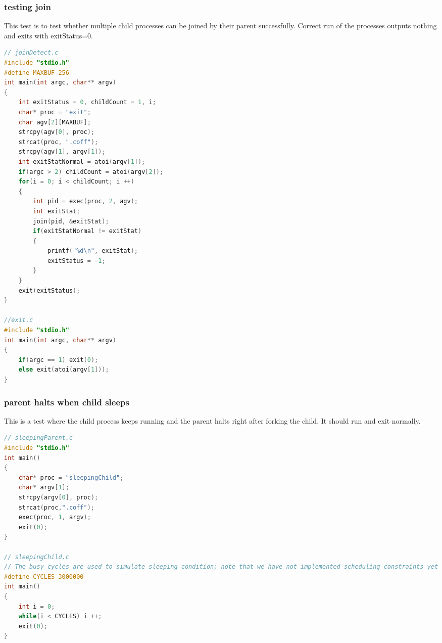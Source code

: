 \documentclass{article}
\begin{document}
\begin{spacing}{1.1}
\subsubsection{testing \textsf{join}}
This test is to test whether multiple child processes can be joined by their parent successfully. Correct run of the processes outputs nothing and exits with \textsf{exitStatus}=0.
\begin{lstlisting}[language=C]
// joinDetect.c
#include "stdio.h"
#define MAXBUF 256
int main(int argc, char** argv)
{
    int exitStatus = 0, childCount = 1, i;
    char* proc = "exit";
    char agv[2][MAXBUF];
    strcpy(agv[0], proc);
    strcat(proc, ".coff");
    strcpy(agv[1], argv[1]);
    int exitStatNormal = atoi(argv[1]);
    if(argc > 2) childCount = atoi(argv[2]);
    for(i = 0; i < childCount; i ++)
    {
        int pid = exec(proc, 2, agv);
        int exitStat;
        join(pid, &exitStat);
        if(exitStatNormal != exitStat)
        {
            printf("%d\n", exitStat);
            exitStatus = -1;
        }
    }
    exit(exitStatus);
}

//exit.c
#include "stdio.h"
int main(int argc, char** argv)
{
    if(argc == 1) exit(0);
    else exit(atoi(argv[1]));
}
\end{lstlisting}

\subsubsection{parent halts when child sleeps}
This is a test where the child process keeps running and the parent halts right after forking the child. It should run and exit normally.
\begin{lstlisting}[language=C]
// sleepingParent.c
#include "stdio.h"
int main()
{
    char* proc = "sleepingChild";
    char* argv[1];
    strcpy(argv[0], proc);
    strcat(proc,".coff");
    exec(proc, 1, argv);
    exit(0);
}

// sleepingChild.c
// The busy cycles are used to simulate sleeping condition; note that we have not implemented scheduling constraints yet
#define CYCLES 3000000
int main()
{
    int i = 0;
    while(i < CYCLES) i ++;
    exit(0);
}
\end{lstlisting}


\end{spacing}
\end{document}
